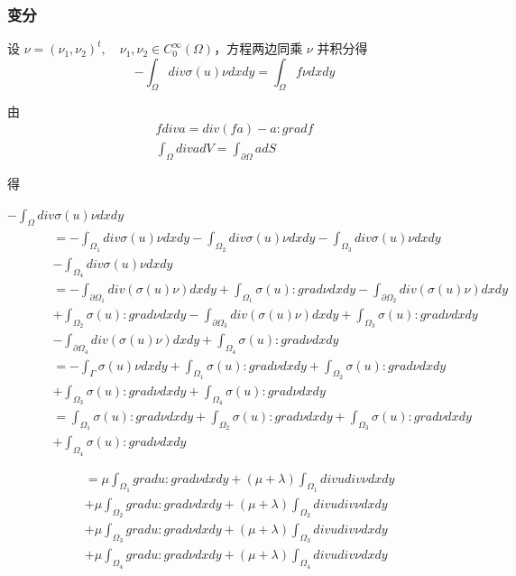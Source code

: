 \documentclass[a4paper,UTF8,titlepage]{ctexart}
\begin{document}
\subsubsection{变分}

设 $\nu = (\nu_1,\nu_2)^t, \quad \nu_1, \nu_2 \in C_0^{\infty}(\Omega)$，方程两边同乘 $\nu$ 并积分得
$$
-\int_{\Omega} div \sigma(u) \nu dxdy = \int_{\Omega} f \nu dxdy
$$

由
$$
\begin{matrix}
	f div a = div(fa) - a : grad f \\
	\int_{\Omega} div a dV = \int_{\partial \Omega} a dS
\end{matrix}
$$

得
\par \quad \quad
$-\int_{\Omega} div \sigma(u) \nu dxdy$
$$ 
\quad \quad
\begin{matrix}
	\begin{aligned}
		&= -\int_{\Omega_1} div \sigma(u) \nu dxdy -\int_{\Omega_2} div \sigma(u) \nu dxdy - \int_{\Omega_3} div \sigma(u) \nu dxdy \\
		&-\int_{\Omega_4} div \sigma(u) \nu dxdy \\
		&= -\int_{\partial \Omega_1} div(\sigma(u) \nu) dxdy + \int_{\Omega_1} \sigma(u) : grad \nu dxdy -\int_{\partial \Omega_2} div(\sigma(u) \nu) dxdy \\
		&+ \int_{\Omega_2} \sigma(u) : grad \nu dxdy - \int_{\partial \Omega_3} div(\sigma(u) \nu) dxdy + \int_{\Omega_3} \sigma(u) : grad \nu dxdy \\
		&-\int_{\partial \Omega_4} div(\sigma(u) \nu) dxdy + \int_{\Omega_4} \sigma(u) : grad \nu dxdy \\
		&= -\int_{\Gamma} \sigma(u) \nu dxdy + \int_{\Omega_1} \sigma(u) : grad \nu dxdy 
		+ \int_{\Omega_2} \sigma(u) : grad \nu dxdy \\
		&+ \int_{\Omega_3} \sigma(u) : grad \nu dxdy + \int_{\Omega_4} \sigma(u) : grad \nu dxdy\\
		&= \int_{\Omega_1} \sigma(u) : grad \nu dxdy + \int_{\Omega_2} \sigma(u) : grad \nu dxdy + \int_{\Omega_3} \sigma(u) : grad \nu dxdy \\
		&+ \int_{\Omega_4} \sigma(u) : grad \nu dxdy \\
	\end{aligned}
\end{matrix}
$$
$$
\begin{matrix}
	\begin{aligned}
		&= \mu \int_{\Omega_1} grad u : grad \nu dxdy + (\mu +\lambda) \int_{\Omega_1} div u div \nu  dxdy \\
		&+ \mu \int_{\Omega_2} grad u : grad \nu dxdy + (\mu +\lambda) \int_{\Omega_2} div u div \nu  dxdy \\
		&+ \mu \int_{\Omega_3} grad u : grad \nu dxdy + (\mu +\lambda) \int_{\Omega_3} div u div \nu  dxdy \\
		&+ \mu \int_{\Omega_4} grad u : grad \nu dxdy + (\mu +\lambda) \int_{\Omega_4} div u div \nu  dxdy
	\end{aligned}
\end{matrix}
$$
\end{document}
